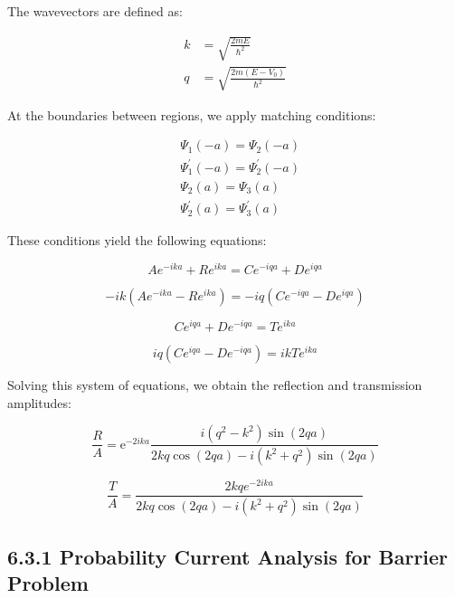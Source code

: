 \documentclass[italian]{HKNdocument}
\begin{document}
The wavevectors are defined as:

\begin{align*}
k & =\sqrt{\frac{2 m E}{\hbar^{2}}} \\
q & =\sqrt{\frac{2 m\left(E-V_{0}\right)}{\hbar^{2}}} \tag{6.53}
\end{align*}

At the boundaries between regions, we apply matching conditions:

\begin{align*}
& \Psi_{1}(-a)=\Psi_{2}(-a) \\
& \Psi_{1}^{\prime}(-a)=\Psi_{2}^{\prime}(-a) \\
& \Psi_{2}(a)=\Psi_{3}(a)  \tag{6.54}\\
& \Psi_{2}^{\prime}(a)=\Psi_{3}^{\prime}(a)
\end{align*}

These conditions yield the following equations:

\begin{equation*}
A e^{-i k a}+R e^{i k a}=C e^{-i q a}+D e^{i q a} \tag{6.55}
\end{equation*}

\begin{equation*}
-i k\left(A e^{-i k a}-R e^{i k a}\right)=-i q\left(C e^{-i q a}-D e^{i q a}\right) \tag{6.56}
\end{equation*}

\begin{equation*}
C e^{i q a}+D e^{-i q a}=T e^{i k a} \tag{6.57}
\end{equation*}

\begin{equation*}
i q\left(C e^{i q a}-D e^{-i q a}\right)=i k T e^{i k a} \tag{6.58}
\end{equation*}

Solving this system of equations, we obtain the reflection and transmission amplitudes:

\begin{equation*}
\frac{R}{A}=\mathrm{e}^{-2 i k a} \frac{i\left(q^{2}-k^{2}\right) \sin (2 q a)}{2 k q \cos (2 q a)-i\left(k^{2}+q^{2}\right) \sin (2 q a)} \tag{6.59}
\end{equation*}

\begin{equation*}
\frac{T}{A}=\frac{2 k q e^{-2 i k a}}{2 k q \cos (2 q a)-i\left(k^{2}+q^{2}\right) \sin (2 q a)} \tag{6.60}
\end{equation*}


\subsection*{6.3.1 Probability Current Analysis for Barrier Problem}
\end{document}
